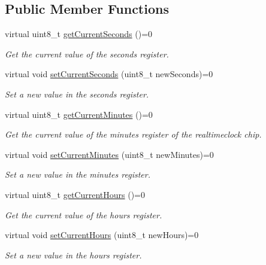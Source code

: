 \subsection*{Public Member Functions}
\begin{DoxyCompactItemize}
\item 
virtual uint8\+\_\+t \mbox{\hyperlink{classreal_time_clock_a46bfe69dc650cc27e648ac7adb03afd0}{get\+Current\+Seconds}} ()=0
\begin{DoxyCompactList}\small\item\em Get the current value of the seconds register. \end{DoxyCompactList}\item 
virtual void \mbox{\hyperlink{classreal_time_clock_a463a64d4861c75e26a80712e1dd50e6b}{set\+Current\+Seconds}} (uint8\+\_\+t new\+Seconds)=0
\begin{DoxyCompactList}\small\item\em Set a new value in the seconds register. \end{DoxyCompactList}\item 
virtual uint8\+\_\+t \mbox{\hyperlink{classreal_time_clock_a8436f171be03d35a931004b3f3b144e9}{get\+Current\+Minutes}} ()=0
\begin{DoxyCompactList}\small\item\em Get the current value of the minutes register of the realtimeclock chip. \end{DoxyCompactList}\item 
virtual void \mbox{\hyperlink{classreal_time_clock_a52da7366cd5f1e4c270eb87e7298da42}{set\+Current\+Minutes}} (uint8\+\_\+t new\+Minutes)=0
\begin{DoxyCompactList}\small\item\em Set a new value in the minutes register. \end{DoxyCompactList}\item 
virtual uint8\+\_\+t \mbox{\hyperlink{classreal_time_clock_a2861a9bc75466a762b4cd8ce37193247}{get\+Current\+Hours}} ()=0
\begin{DoxyCompactList}\small\item\em Get the current value of the hours register. \end{DoxyCompactList}\item 
virtual void \mbox{\hyperlink{classreal_time_clock_a515d9de6067ae563bff5217da5100a23}{set\+Current\+Hours}} (uint8\+\_\+t new\+Hours)=0
\begin{DoxyCompactList}\small\item\em Set a new value in the hours register. \end{DoxyCompactList}\item 

\end{DoxyCompactItemize}
